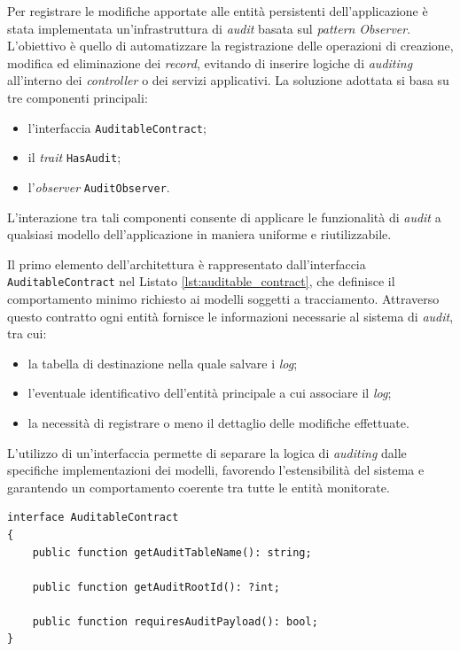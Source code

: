 Per registrare le modifiche apportate alle entità persistenti dell'applicazione è stata implementata un'infrastruttura di \textit{audit} basata sul \textit{pattern} \textit{Observer}. L'obiettivo è quello di automatizzare la registrazione delle operazioni di creazione, modifica ed eliminazione dei \textit{record}, evitando di inserire logiche di \textit{auditing} all'interno dei \textit{controller} o dei servizi applicativi.
La soluzione adottata si basa su tre componenti principali:
\begin{itemize}
	\item l'interfaccia \texttt{AuditableContract};
	\item il \textit{trait} \texttt{HasAudit};
	\item l'\textit{observer} \texttt{AuditObserver}.
\end{itemize}
L'interazione tra tali componenti consente di applicare le funzionalità di \textit{audit} a qualsiasi modello dell'applicazione in maniera uniforme e riutilizzabile.

Il primo elemento dell'architettura è rappresentato dall'interfaccia \texttt{AuditableContract} nel Listato \ref{lst:auditable_contract}, che definisce il comportamento minimo richiesto ai modelli soggetti a tracciamento. Attraverso questo contratto ogni entità fornisce le informazioni necessarie al sistema di \textit{audit}, tra cui:
\begin{itemize}
	\item la tabella di destinazione nella quale salvare i \textit{log};
	\item l'eventuale identificativo dell'entità principale a cui associare il \textit{log};
	\item la necessità di registrare o meno il dettaglio delle modifiche effettuate.
\end{itemize}
L'utilizzo di un'interfaccia permette di separare la logica di \textit{auditing} dalle specifiche implementazioni dei modelli, favorendo l'estensibilità del sistema e garantendo un comportamento coerente tra tutte le entità monitorate.

\begin{lstlisting}[float=!t, caption={Definizione dell'interfaccia AuditableContract.}, captionpos=b, label={lst:auditable_contract}, basicstyle=\ttfamily\footnotesize, lineskip=-1pt, breaklines=true, breakatwhitespace=true]
interface AuditableContract
{
	public function getAuditTableName(): string;
	
	public function getAuditRootId(): ?int;
	
	public function requiresAuditPayload(): bool;
}
\end{lstlisting}

